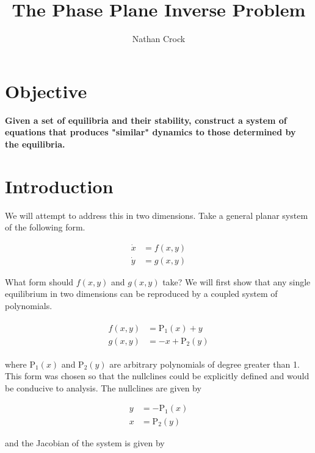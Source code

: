 \documentclass{article}
\title{The Phase Plane Inverse Problem}
\author{Nathan Crock}
\begin{document}
    
    
    \maketitle
    
    

    
\section{Objective}\label{sec:objective}

\textbf{Given a set of equilibria and their stability, construct a
system of equations that produces "similar" dynamics to those determined
by the equilibria.} \\

\section{Introduction}\label{sec:introduction}

We will attempt to address this in two dimensions. Take a general planar system of the following form.

\begin{align*}
\dot x &= f(x,y) \\
\dot y &= g(x,y)
\end{align*}

\noindent What form should $f(x,y)$ and $g(x,y)$ take? We will first show that
any single equilibrium in two dimensions can be reproduced by a coupled system
of polynomials.

\begin{align}
    \begin{split}
    f(x,y) &= \text{P}_1(x)+y \\
    g(x,y) &= -x+\text{P}_2(y) \label{eq:system}
    \end{split}
\end{align}

\noindent where P$_1(x)$ and P$_2(y)$ are arbitrary polynomials of degree greater than 1.
This form was chosen so that the nullclines could be explicitly defined
and would be conducive to analysis. The nullclines are given by

\begin{align}
    y &= -\text{P}_1(x) \label{eq:x-null}\\ 
    x &= \text{P}_2(y) \label{eq:y-null}
\end{align}

\noindent and the Jacobian of the system is given by
\end{document}
